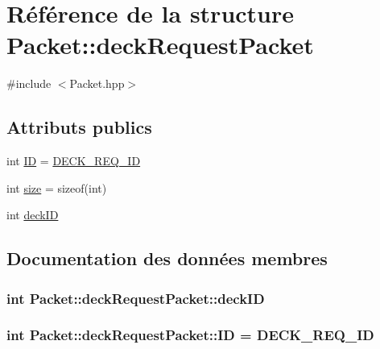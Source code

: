 \hypertarget{structPacket_1_1deckRequestPacket}{}\section{Référence de la structure Packet\+:\+:deck\+Request\+Packet}
\label{structPacket_1_1deckRequestPacket}


{\ttfamily \#include $<$Packet.\+hpp$>$}

\subsection*{Attributs publics}
\begin{DoxyCompactItemize}
\item 
int \hyperlink{structPacket_1_1deckRequestPacket_a50b1afe744dfe580cee9c9add401f15d}{I\+D} = \hyperlink{classPacket_ae91c1d355e4c8f0bef5f893747473661aa0822f1f646c2ea8411b06af9f6fc40c}{D\+E\+C\+K\+\_\+\+R\+E\+Q\+\_\+\+I\+D}
\item 
int \hyperlink{structPacket_1_1deckRequestPacket_a21f7ca382cdcd158f55feddfde07149f}{size} = sizeof(int)
\item 
int \hyperlink{structPacket_1_1deckRequestPacket_a4ef744c30568bf6ceaeb99411bc8c845}{deck\+I\+D}
\end{DoxyCompactItemize}


\subsection{Documentation des données membres}
\hypertarget{structPacket_1_1deckRequestPacket_a4ef744c30568bf6ceaeb99411bc8c845}{}
\subsubsection[{deck\+I\+D}]{\setlength{\rightskip}{0pt plus 5cm}int Packet\+::deck\+Request\+Packet\+::deck\+I\+D}\label{structPacket_1_1deckRequestPacket_a4ef744c30568bf6ceaeb99411bc8c845}
\hypertarget{structPacket_1_1deckRequestPacket_a50b1afe744dfe580cee9c9add401f15d}{}
\subsubsection[{I\+D}]{\setlength{\rightskip}{0pt plus 5cm}int Packet\+::deck\+Request\+Packet\+::\+I\+D = {\bf D\+E\+C\+K\+\_\+\+R\+E\+Q\+\_\+\+I\+D}}\label{structPacket_1_1deckRequestPacket_a50b1afe744dfe580cee9c9add401f15d}
\hypertarget{structPacket_1_1deckRequestPacket_a21f7ca382cdcd158f55feddfde07149f}{}
